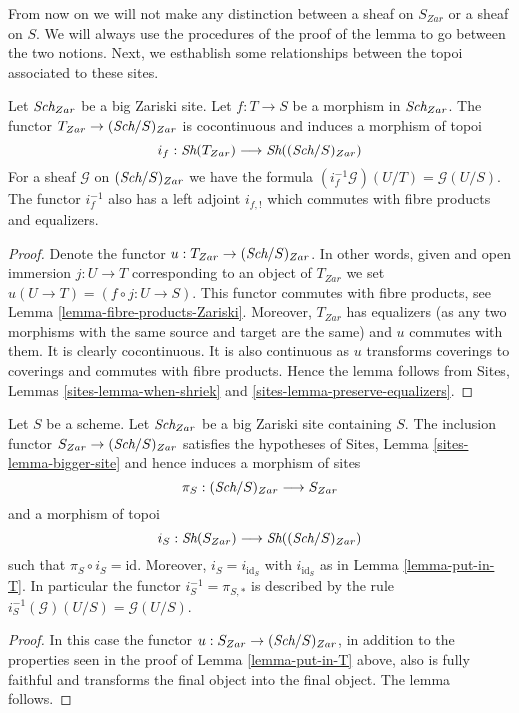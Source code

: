 \noindent
From now on we will not make any distinction between a sheaf on
$S_{Zar}$ or a sheaf on $S$. We will always use the procedures
of the proof of the lemma to go between the two notions.
Next, we esthablish some relationships between the topoi
associated to these sites.

\begin{lemma}
\label{lemma-put-in-T}
Let $\textit{Sch}_{Zar}$ be a big Zariski site.
Let $f : T \to S$ be a morphism in $\textit{Sch}_{Zar}$.
The functor $T_{Zar} \to (\textit{Sch}/S)_{Zar}$
is cocontinuous and induces a morphism of topoi
$$
i_f :
\mathop{\textit{Sh}}\nolimits(T_{Zar})
\longrightarrow
\mathop{\textit{Sh}}\nolimits((\textit{Sch}/S)_{Zar})
$$
For a sheaf $\mathcal{G}$ on $(\textit{Sch}/S)_{Zar}$
we have the formula $(i_f^{-1}\mathcal{G})(U/T) = \mathcal{G}(U/S)$.
The functor $i_f^{-1}$ also has a left adjoint $i_{f, !}$ which commutes
with fibre products and equalizers.
\end{lemma}

\begin{proof}
Denote the functor $u : T_{Zar} \to (\textit{Sch}/S)_{Zar}$.
In other words, given and open immersion $j : U \to T$ corresponding
to an object of $T_{Zar}$ we set $u(U \to T) = (f \circ j : U \to S)$.
This functor commutes with fibre products, see
Lemma \ref{lemma-fibre-products-Zariski}.
Moreover, $T_{Zar}$ has equalizers (as any two morphisms with the same
source and target are the same) and $u$ commutes with them.
It is clearly cocontinuous.
It is also continuous as $u$ transforms coverings to coverings and
commutes with fibre products. Hence the lemma follows from
Sites, Lemmas \ref{sites-lemma-when-shriek}
and \ref{sites-lemma-preserve-equalizers}.
\end{proof}

\begin{lemma}
\label{lemma-at-the-bottom}
Let $S$ be a scheme. Let $\textit{Sch}_{Zar}$ be a big Zariski
site containing $S$.
The inclusion functor $S_{Zar} \to (\textit{Sch}/S)_{Zar}$
satisfies the hypotheses of Sites, Lemma \ref{sites-lemma-bigger-site}
and hence induces a morphism of sites
$$
\pi_S : (\textit{Sch}/S)_{Zar} \longrightarrow S_{Zar}
$$
and a morphism of topoi
$$
i_S : \mathop{\textit{Sh}}\nolimits(S_{Zar}) \longrightarrow \mathop{\textit{Sh}}\nolimits((\textit{Sch}/S)_{Zar})
$$
such that $\pi_S \circ i_S = \text{id}$. Moreover, $i_S = i_{\text{id}_S}$
with $i_{\text{id}_S}$ as in Lemma \ref{lemma-put-in-T}. In particular the
functor $i_S^{-1} = \pi_{S, *}$ is described by the rule
$i_S^{-1}(\mathcal{G})(U/S) = \mathcal{G}(U/S)$.
\end{lemma}

\begin{proof}
In this case the functor $u : S_{Zar} \to (\textit{Sch}/S)_{Zar}$,
in addition to the properties seen in the proof of
Lemma \ref{lemma-put-in-T} above, also is fully faithful
and transforms the final object into the final object.
The lemma follows.
\end{proof}

